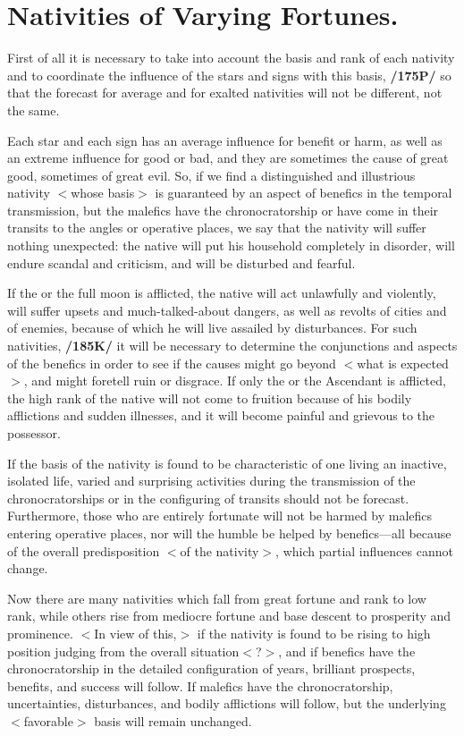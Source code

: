 \section{Nativities of Varying Fortunes.}

First of all it is necessary to take into account the basis and rank of each nativity and to coordinate the influence of the stars and signs with this basis, \textbf{/175P/} so that the forecast for average and for exalted nativities will not be different, not the same. 

Each star and each sign has an average influence for benefit or harm, as well as an extreme influence for good or bad, and they are sometimes the cause of great good, sometimes of great evil. So, if we find a distinguished and illustrious nativity $<$whose basis$>$ is guaranteed by an aspect of benefics in the temporal transmission, but the malefics have the chronocratorship or have come in their transits to the angles or operative places, we say that the nativity will suffer nothing unexpected: the native will put his household completely in disorder, will endure scandal and criticism, and will be disturbed and fearful. 

If the \Sun\xspace or the full moon is afflicted, the native will act unlawfully and violently, will suffer upsets and much-talked-about dangers, as well as revolts of cities and of enemies, because of which he will live assailed by disturbances. For such nativities, \textbf{/185K/} it will be necessary to determine the conjunctions and aspects of the benefics in order to see if the causes might go beyond $<$what is expected$>$, and might foretell ruin or disgrace. If only the \Moon\xspace or the Ascendant is afflicted, the high rank of the native will not come to fruition because of his bodily afflictions and sudden illnesses, and it will become painful and grievous to the possessor.

If the basis of the nativity is found to be characteristic of one living an inactive, isolated life, varied and surprising activities during the transmission of the chronocratorships or in the configuring of transits should not be forecast. Furthermore, those who are entirely fortunate will not be harmed by malefics entering operative places, nor will the humble be helped by benefics—all because of the overall predisposition $<$of the nativity$>$, which partial influences cannot change. 

Now there are many nativities which fall from great fortune and rank to low rank, while others rise from mediocre fortune and base descent to prosperity and prominence. $<$In view of this,$>$ if the nativity is found to be rising to high position judging from the overall situation$<$?$>$, and if benefics have the chronocratorship in the detailed configuration of years, brilliant prospects, benefits, and success will follow. If malefics have the chronocratorship, uncertainties, disturbances, and bodily afflictions will follow, but the underlying $<$favorable$>$ basis will remain unchanged. 


